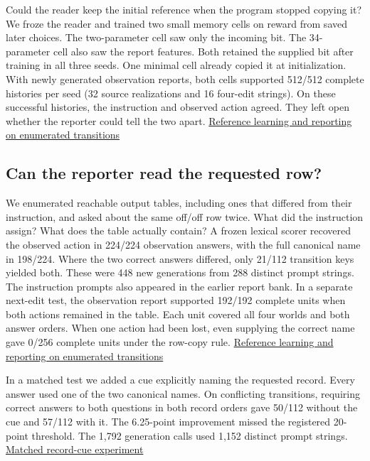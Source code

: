 \documentclass[11pt]{article}
\begin{document}
Could the reader keep the initial reference when the program stopped copying it? We froze the reader and trained two small memory cells on reward from saved later choices. The two-parameter cell saw only the incoming bit. The 34-parameter cell also saw the report features. Both retained the supplied bit after training in all three seeds. One minimal cell already copied it at initialization. With newly generated observation reports, both cells supported 512/512 complete histories per seed (32 source realizations and 16 four-edit strings). On these successful histories, the instruction and observed action agreed. They left open whether the reporter could tell the two apart. \href{https://github.com/RyoSpiralArchitect/self-fold/blob/af3c25e454c2d0d9241b54dce343218b925a9ee1/provenance/message_boundary_20261106/write10/RESULTS.md}{Reference learning and reporting on enumerated transitions}

\subsection{Can the reporter read the requested row?}

We enumerated reachable output tables, including ones that differed from their instruction, and asked about the same off/off row twice. What did the instruction assign? What does the table actually contain? A frozen lexical scorer recovered the observed action in 224/224 observation answers, with the full canonical name in 198/224. Where the two correct answers differed, only 21/112 transition keys yielded both. These were 448 new generations from 288 distinct prompt strings. The instruction prompts also appeared in the earlier report bank. In a separate next-edit test, the observation report supported 192/192 complete units when both actions remained in the table. Each unit covered all four worlds and both answer orders. When one action had been lost, even supplying the correct name gave 0/256 complete units under the row-copy rule. \href{https://github.com/RyoSpiralArchitect/self-fold/blob/af3c25e454c2d0d9241b54dce343218b925a9ee1/provenance/message_boundary_20261106/write10/RESULTS.md}{Reference learning and reporting on enumerated transitions}

In a matched test we added a cue explicitly naming the requested record. Every answer used one of the two canonical names. On conflicting transitions, requiring correct answers to both questions in both record orders gave 50/112 without the cue and 57/112 with it. The 6.25-point improvement missed the registered 20-point threshold. The 1,792 generation calls used 1,152 distinct prompt strings. \href{https://github.com/RyoSpiralArchitect/self-fold/blob/dbb4823f03f76f3aaa5a62270753e73a9c91e86b/provenance/message_boundary_20261106/write11/RESULTS.md}{Matched record-cue experiment}
\end{document}
